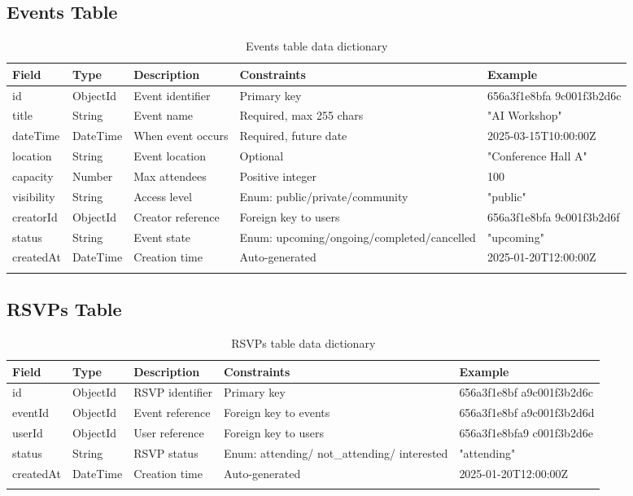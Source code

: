 \subsection{Events Table}
\begin{longtable}{|L{3cm}|C{2cm}|L{2.5cm}|L{3cm}|L{3cm}|}
\hline
\textbf{Field} & \textbf{Type} & \textbf{Description} & \textbf{Constraints} & \textbf{Example} \\ \hline
\endhead

id & ObjectId & Event identifier & Primary key & 656a3f1e8bfa 9c001f3b2d6c \\ \hline
title & String & Event name & Required, max 255 chars & "AI Workshop" \\ \hline
dateTime & DateTime & When event occurs & Required, future date & 2025-03-15T10:00:00Z \\ \hline
location & String & Event location & Optional & "Conference Hall A" \\ \hline
capacity & Number & Max attendees & Positive integer & 100 \\ \hline
visibility & String & Access level & Enum: public/private/community & "public" \\ \hline
creatorId & ObjectId & Creator reference & Foreign key to users & 656a3f1e8bfa 9c001f3b2d6f \\ \hline
status & String & Event state & Enum: upcoming/ongoing/completed/cancelled & "upcoming" \\ \hline
createdAt & DateTime & Creation time & Auto-generated & 2025-01-20T12:00:00Z \\ \hline

\caption{Events table data dictionary}
\label{tab:events_dict}
\end{longtable}

\subsection{RSVPs Table}
\begin{longtable}{|L{3cm}|C{2cm}|L{2.5cm}|L{3cm}|L{3cm}|}
\hline
\textbf{Field} & \textbf{Type} & \textbf{Description} & \textbf{Constraints} & \textbf{Example} \\ \hline
\endhead

id & ObjectId & RSVP identifier & Primary key & 656a3f1e8bf a9c001f3b2d6c \\ \hline
eventId & ObjectId & Event reference & Foreign key to events & 656a3f1e8bf a9c001f3b2d6d \\ \hline
userId & ObjectId & User reference & Foreign key to users & 656a3f1e8bfa9 c001f3b2d6e \\ \hline
status & String & RSVP status & Enum:  attending/ not\_attending/ interested & "attending" \\ \hline
createdAt & DateTime & Creation time & Auto-generated & 2025-01-20T12:00:00Z \\ \hline

\caption{RSVPs table data dictionary}
\label{tab:rsvps_dict}
\end{longtable}

